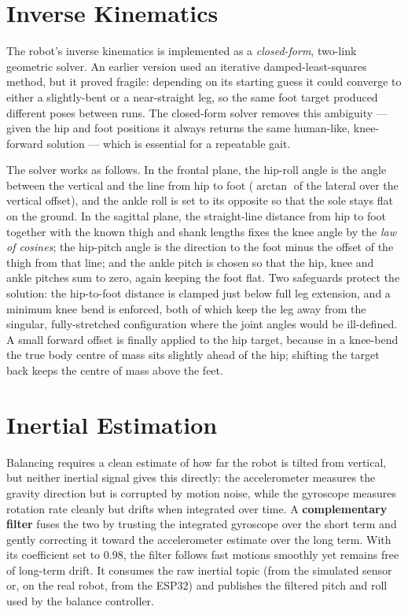 \section{Inverse Kinematics}
\label{sec:ik}
The robot's inverse kinematics is implemented as a \emph{closed-form},
two-link geometric solver. An earlier version used an iterative
damped-least-squares method, but it proved fragile: depending on its
starting guess it could converge to either a slightly-bent or a
near-straight leg, so the same foot target produced different poses
between runs. The closed-form solver removes this ambiguity --- given the
hip and foot positions it always returns the same human-like,
knee-forward solution --- which is essential for a repeatable gait.

The solver works as follows. In the frontal plane, the hip-roll angle is
the angle between the vertical and the line from hip to foot
($\arctan$ of the lateral over the vertical offset), and the ankle roll is
set to its opposite so that the sole stays flat on the ground. In the
sagittal plane, the straight-line distance from hip to foot together with
the known thigh and shank lengths fixes the knee angle by the
\emph{law of cosines}; the hip-pitch angle is the direction to the foot
minus the offset of the thigh from that line; and the ankle pitch is
chosen so that the hip, knee and ankle pitches sum to zero, again keeping
the foot flat. Two safeguards protect the solution: the hip-to-foot
distance is clamped just below full leg extension, and a minimum knee bend
is enforced, both of which keep the leg away from the singular,
fully-stretched configuration where the joint angles would be
ill-defined. A small forward offset is finally applied to the hip target,
because in a knee-bend the true body centre of mass sits slightly ahead of
the hip; shifting the target back keeps the centre of mass above the feet.

\section{Inertial Estimation}
\label{sec:imu-filter}
Balancing requires a clean estimate of how far the robot is tilted from
vertical, but neither inertial signal gives this directly: the
accelerometer measures the gravity direction but is corrupted by motion
noise, while the gyroscope measures rotation rate cleanly but drifts when
integrated over time. A \textbf{complementary filter} fuses the two by
trusting the integrated gyroscope over the short term and gently
correcting it toward the accelerometer estimate over the long term. With
its coefficient set to $0.98$, the filter follows fast motions smoothly
yet remains free of long-term drift. It consumes the raw inertial topic
(from the simulated sensor or, on the real robot, from the ESP32) and
publishes the filtered pitch and roll used by the balance controller.

